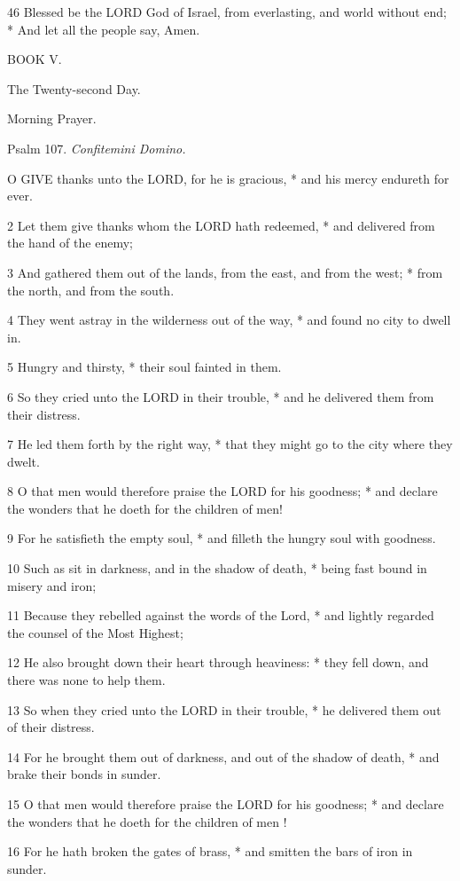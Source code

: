 46
Blessed be the LORD God of Israel, from everlasting,
and world without end; * And let all the people say, Amen.

BOOK
V.

The
Twenty-second Day.

Morning
Prayer.

Psalm
107. \emph{Confitemini Domino.}

O
GIVE thanks unto the LORD, for he is gracious,
* and his mercy endureth for ever.

2 Let them give thanks whom the LORD
hath redeemed, * and delivered from the hand of the enemy;

3 And gathered them out of the lands, from the east,
and from the west; * from the north, and from the south.

4 They went astray in the wilderness out of the way,
* and found no city to dwell in.

5 Hungry and thirsty, * their soul fainted in them.

6 So they cried unto the LORD
in their trouble, * and he delivered them from their distress.

7 He led them forth by the right way, * that they might
go to the city where they dwelt.

8 O that men would therefore praise the LORD
for his goodness; * and declare the wonders that he doeth for the children
of men!

9 For he satisfieth the empty soul, * and filleth the
hungry soul with goodness.

10 Such as sit in darkness,
and in the shadow of death, * being fast bound in misery and iron;

11 Because they rebelled against the words of the Lord,
* and lightly regarded the counsel of the Most Highest;

12 He also brought down their heart through heaviness:
* they fell down, and there was none to help them.

13 So when they cried unto the LORD
in their trouble, * he delivered them out of their distress.

14 For he brought them out of darkness, and out of
the shadow of death, * and brake their bonds in sunder.

15 O that men would therefore praise the LORD
for his goodness; * and declare the wonders that he doeth for the children
of men !

16 For he hath broken the gates of brass, * and smitten
the bars of iron in sunder.


